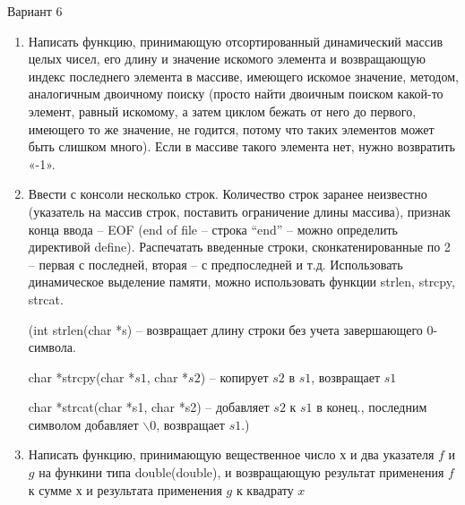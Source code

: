\documentclass[a4paper, 10pt]{article}
\begin{document}

Вариант 6

\begin{enumerate}
    \item Написать функцию, принимающую отсортированный динамический массив целых чисел,
    его длину и значение искомого элемента и возвращающую индекс последнего элемента 
    в массиве, имеющего искомое значение, методом, аналогичным двоичному поиску (просто
    найти двоичным поиском какой-то элемент, равный искомому, а затем циклом бежать от 
    него до первого, имеющего то же значение, не годится, потому что таких элементов может 
    быть слишком много). Если в массиве такого элемента нет, нужно возвратить  «-1».
    \item Ввести с консоли несколько строк. Количество строк заранее неизвестно (указатель
    на массив строк, поставить ограничение длины массива), признак конца ввода – EOF (end
    of file – строка “end” – можно определить директивой define). Распечатать введенные
    строки, сконкатенированные по 2 – первая с последней, вторая – с предпоследней и т.д.
    Использовать динамическое выделение памяти, можно использовать функции strlen, strcpy,
    strcat.

    (int strlen(char *s) – возвращает длину строки без учета завершающего 0-символа.

    char *strcpy(char *$s1$, char *$s2$) – копирует $s2$ в $s1$, возвращает $s1$

    char *strcat(char *s1, char *s2) – добавляет $s2$ к $s1$ в конец., последним символом добавляет
    $\backslash0$, возвращает $s1$.)
    \item Написать функцию, принимающую вещественное число х и два указателя $f$ и $g$ на функини 
    типа double(double), и возвращающую результат применения $f$ к сумме $х$ и результата 
    применения $g$ к квадрату $x$
    
\end{enumerate}
\end{document}
